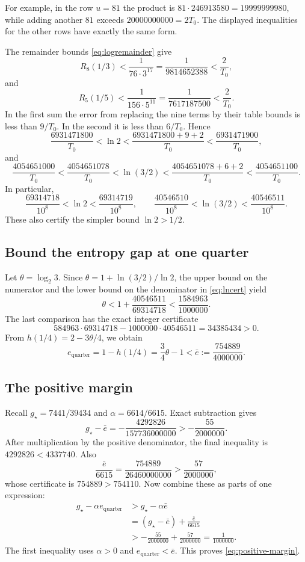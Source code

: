 \documentclass[11pt]{article}
\theoremstyle{definition}
\theoremstyle{remark}
\newcommand{\er}{e_{\mathrm{quarter}}}
\numberwithin{equation}{section}
\begin{document}
For example, in the row \(u=81\) the product is
\(81\cdot246913580=19999999980\), while adding another \(81\)
exceeds \(20000000000=2T_0\).
The displayed inequalities for the other rows have exactly the
same form.

The remainder bounds \eqref{eq:logremainder} give
\[
 R_8(1/3)<\frac1{76\cdot3^{17}}=\frac1{9814652388}
 <\frac2{T_0},
\]
and
\[
 R_5(1/5)<\frac1{156\cdot5^{11}}=\frac1{7617187500}
 <\frac2{T_0}.
\]
In the first sum the error from replacing the nine terms by their
table bounds is less than \(9/T_0\). In the second it is less than
\(6/T_0\). Hence
\[
 \frac{6931471800}{T_0}<\ln2<
 \frac{6931471800+9+2}{T_0}
 <\frac{6931471900}{T_0},
\]
and
\[
 \frac{4054651000}{T_0}
 <\frac{4054651078}{T_0}<\ln(3/2)
 <\frac{4054651078+6+2}{T_0}
 <\frac{4054651100}{T_0}.
\]
In particular,
\begin{equation}\label{eq:lncert}
 \frac{69314718}{10^8}<\ln2<\frac{69314719}{10^8},
 \qquad
 \frac{40546510}{10^8}<\ln(3/2)<\frac{40546511}{10^8}.
\end{equation}
These also certify the simpler bound \(\ln2>1/2\).

\subsection{Bound the entropy gap at one quarter}

Let \(\theta=\log_2 3\). Since
\(\theta=1+\ln(3/2)/\ln2\), the upper bound on the numerator and
the lower bound on the denominator in \eqref{eq:lncert} yield
\[
 \theta<1+\frac{40546511}{69314718}
 <\frac{1584963}{1000000}.
\]
The last comparison has the exact integer certificate
\[
 584963\cdot69314718-1000000\cdot40546511
 =34385434>0.
\]
From \(h(1/4)=2-3\theta/4\), we obtain
\begin{equation}\label{eq:ebar}
 \er=1-h(1/4)=\frac34\theta-1
 <\bar e:=\frac{754889}{4000000}.
\end{equation}

\subsection{The positive margin}

Recall \(g_\star=7441/39434\) and \(\alpha=6614/6615\).
Exact subtraction gives
\[
 g_\star-\bar e
 =-\frac{4292826}{157736000000}>
 -\frac{55}{2000000}.
\]
After multiplication by the positive denominator, the final
inequality is \(4292826<4337740\).
Also
\[
 \frac{\bar e}{6615}
 =\frac{754889}{26460000000}>
 \frac{57}{2000000},
\]
whose certificate is \(754889>754110\).
Now combine these as parts of one expression:
\begin{align*}
 g_\star-\alpha\er
 &>g_\star-\alpha\bar e\\
 &=(g_\star-\bar e)+\frac{\bar e}{6615}\\
 &>-\frac{55}{2000000}+\frac{57}{2000000}
 =\frac1{1000000}.
\end{align*}
The first inequality uses \(\alpha>0\) and \(\er<\bar e\).
This proves \eqref{eq:positive-margin}.
\end{document}
